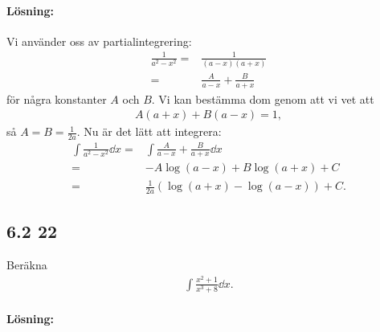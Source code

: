\paragraph{Lösning:}

Vi använder oss av partialintegrering:
\begin{align*}
	\frac{1}{a^2 - x^2} ={}& \frac{1}{(a - x) (a + x)}\\
	={}& \frac{A}{a - x} + \frac{B}{a + x}
\end{align*}
för några konstanter $A$ och $B$.
Vi kan bestämma dom genom att vi vet att
\begin{align*}
	A (a + x) + B (a - x) = 1,
\end{align*}
så $A = B = \frac{1}{2 a}$.
Nu är det lätt att integrera:
\begin{align*}
	\int \frac{1}{a^2 - x^2} \dd{x} ={}& \int \frac{A}{a - x} + \frac{B}{a + x} \dd{x}\\
	={}& -A \log{(a - x)} + B \log{(a + x)} + C\\
	={}& \frac{1}{2 a} \left(\log{(a + x)} - \log{(a - x)}\right) + C.
\end{align*}


\subsection{6.2 22}%
\label{sub:6_2_22}

Beräkna
\begin{align*}
	\int \frac{x^2 + 1}{x^3 + 8} \dd{x}.
\end{align*}

\paragraph{Lösning:}


